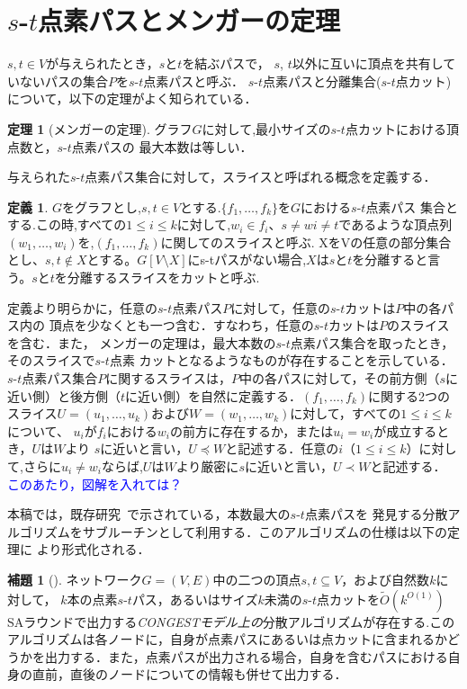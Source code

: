 \documentclass{thesis}
\theoremstyle{definition}
\newtheorem{theorem}{定理}
\newtheorem{lemma}{補題}
\newtheorem{definition}{定義}
\newcommand{\Izumi}[1]{\textcolor{blue}{#1}}
\begin{document}
\section{$s$-$t$点素パスとメンガーの定理}

$s, t \in V$が与えられたとき，$s$と$t$を結ぶパスで，
$s$, $t$以外に互いに頂点を共有していないパスの集合$P$を$s$-$t$点素パスと呼ぶ．
$s$-$t$点素パスと分離集合($s$-$t$点カット)について，以下の定理がよく知られている．

\begin{theorem}[メンガーの定理]
グラフ$G$に対して,最小サイズの$s$-$t$点カットにおける頂点数と，$s$-$t$点素パスの
最大本数は等しい．
\end{theorem}
与えられた$s$-$t$点素パス集合に対して，スライスと呼ばれる概念を定義する．
\begin{definition}
    $G$をグラフとし,$s,t\in V$とする.$\{f_1, \dots ,f_k\}$を$G$における$s$-$t$点素パス
    集合とする.この時,すべての$1\leq i\leq k$に対して,$w_i \in f_i$、$s \neq wi \neq t$であるような頂点列$(w_1, \dots ,w_i)$を,$(f_1, \dots ,f_k)$に関してのスライスと呼ぶ.
    XをVの任意の部分集合とし、$s,t \notin X$とする。$G[V\setminus X]$にs-tパスがない場合,$X$は$s$と$t$を分離すると言う。$s$と$t$を分離するスライスをカットと呼ぶ.
\end{definition}

定義より明らかに，任意の$s$-$t$点素パス$P$に対して，任意の$s$-$t$カットは$P$中の各パス内の
頂点を少なくとも一つ含む．すなわち，任意の$s$-$t$カットは$P$のスライスを含む．また，
メンガーの定理は，最大本数の$s$-$t$点素パス集合を取ったとき，そのスライスで$s$-$t$点素
カットとなるようなものが存在することを示している．
$s$-$t$点素パス集合$P$に関するスライスは，$P$中の各パスに対して，その前方側（$s$に近い側）と後方側（$t$に近い側）を自然に定義する．$(f_1, \dots ,f_k)$に関する2つのスライス$U=(u_1, \dots, u_k)$および$W=(w_1, \dots ,w_k)$に対して，すべての$1\leq i\leq k$について、
$u_i$が$f_i$における$w_i$の前方に存在するか，または$u_i=w_i$が成立するとき，$U$は$W$より
$s$に近いと言い，$U\preceq W$と記述する．任意の$i$（$1 \leq i \leq k$）に対して,さらに$u_i \neq w_i$ならば,$U$は$W$より厳密に$s$に近いと言い，$U \prec W$と記述する．
\Izumi{このあたり，図解を入れては？}


本稿では，既存研究~\cite{li2018distributed}で示されている，本数最大の$s$-$t$点素パスを
発見する分散アルゴリズムをサブルーチンとして利用する．このアルゴリズムの仕様は以下の定理に
より形式化される．

\begin{lemma}[\cite{li2018distributed}] \label{path}
ネットワーク$G=(V,E)$中の二つの頂点$s,t\subseteq V$，および自然数$k$に対して，
$k$本の点素$s$-$t$パス，あるいはサイズ$k$未満の$s$-$t$点カットを$\tilde{O}(k^{O(1)})$
SAラウンドで出力する\textit{CONGESTモデル上の}分散アルゴリズムが存在する.このアルゴリズムは各ノードに，自身が点素パスにあるいは点カットに含まれるかどうかを出力する．また，点素パスが出力される場合，自身を含むパスにおける自身の直前，直後のノードについての情報も併せて出力する．
\end{lemma}
\end{document}

